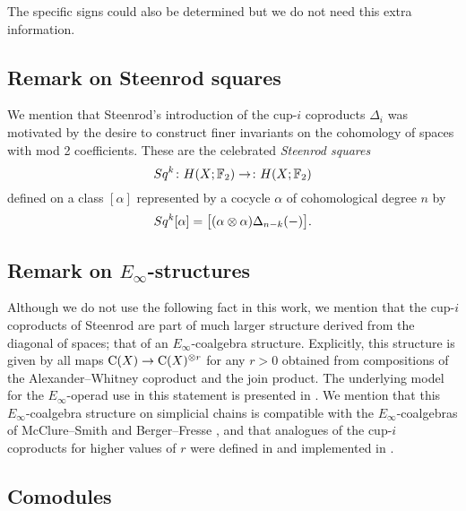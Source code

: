 The specific signs could also be determined but we do not need this extra information.

\subsection{Remark on Steenrod squares}
\label{ss:steenrod squares}

We mention that Steenrod's introduction of the cup-$i$ coproducts $\Delta_i$ was motivated by the desire to construct finer invariants on the cohomology of spaces with mod 2 coefficients.
These are the celebrated \textit{Steenrod squares}
\[
Sq^k \colon H(X; {\mathbb{F}_2}) \to \colon H(X; {\mathbb{F}_2})
\]
defined on a class $[\alpha]$ represented by a cocycle $\alpha$ of cohomological degree $n$ by
\[
Sq^k [\alpha] = \big[ (\alpha \otimes \alpha) \Delta_{n-k}(-) \big].
\]

\subsection{Remark on $E_\infty$-structures}

Although we do not use the following fact in this work, we mention that the cup-$i$ coproducts of Steenrod are part of much larger structure derived from the diagonal of spaces; that of an $E_\infty$-coalgebra structure.
Explicitly, this structure is given by all maps $\operatorname{C}(X) \to \operatorname{C}(X)^{\otimes r}$ for any $r > 0$ obtained from compositions of the Alexander--Whitney coproduct and the join product.
The underlying model for the $E_\infty$-operad use in this statement is presented in \cite{medina2020prop1, medina2021prop2}.
We mention that this $E_\infty$-coalgebra structure on simplicial chains is compatible with the $E_\infty$-coalgebras of McClure--Smith \cite{mcclure2003multivariable} and Berger--Fresse \cite{berger2004combinatorial}, and that analogues of the cup-$i$ coproducts for higher values of $r$ were defined in \cite{medina2021may_st} and implemented in \cite{medina2021comch}.

\subsection{Comodules}

